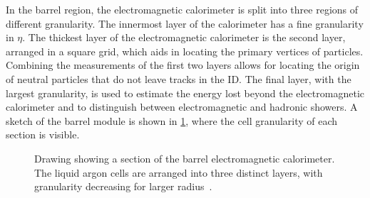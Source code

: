 In the barrel region, the electromagnetic calorimeter is split into three regions of different granularity. The innermost layer of the calorimeter has a fine granularity in $\eta$. The thickest layer of the electromagnetic calorimeter is the second layer, arranged in a square grid, which aids in locating the primary vertices of particles. Combining the measurements of the first two layers allows for locating the origin of neutral particles that do not leave tracks in the ID. The final layer, with the largest granularity, is used to estimate the energy lost beyond the electromagnetic calorimeter and to distinguish between electromagnetic and hadronic showers. A sketch of the barrel module is shown in \cref{fig:method:ATLAS:ECal}, where the cell granularity of each section is visible.
\begin{figure}
    \centering
    \caption[Drawing showing a section of the barrel electromagnetic calorimeter]{Drawing showing a section of the barrel electromagnetic calorimeter.
    The liquid argon cells are arranged into three distinct layers, with granularity decreasing for larger radius~\cite{ATLAS}.}
    \label{fig:method:ATLAS:ECal}
\end{figure}


